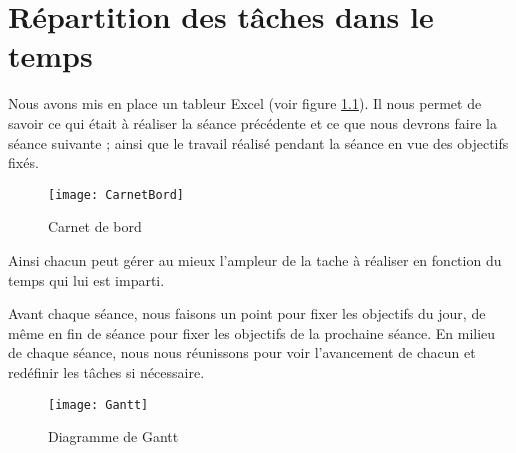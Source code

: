 \chapter{Répartition des tâches dans le temps}

Nous avons mis en place un tableur Excel (voir figure \ref{fig:CarnetBord}). Il nous permet de savoir ce qui était à réaliser la séance précédente et ce que nous devrons faire la séance suivante ; ainsi que le travail réalisé pendant la séance en vue des objectifs fixés. 

\begin{figure}[h]
  \centering
  \texttt{[image: CarnetBord]}
  \caption{Carnet de bord}
  \label{fig:CarnetBord}
\end{figure}

Ainsi chacun peut gérer au mieux l'ampleur de la tache à réaliser en fonction du temps qui lui est imparti.
 
Avant chaque séance, nous faisons un point pour fixer les objectifs du jour, de même en fin de séance pour fixer les objectifs de la prochaine séance. 
En milieu de chaque séance, nous nous réunissons pour voir l'avancement de chacun et redéfinir les tâches si nécessaire. 

\begin{figure}[h]
  \centering
  \texttt{[image: Gantt]}
  \caption{Diagramme de Gantt}
  \label{fig:Gantt}
\end{figure}
